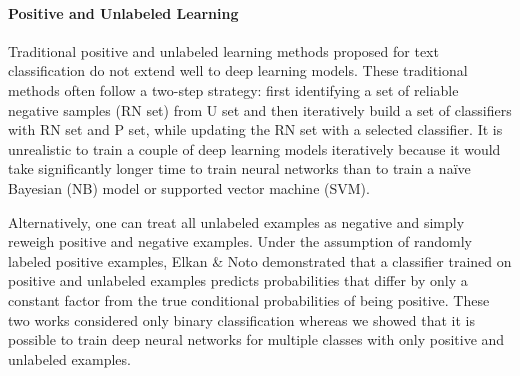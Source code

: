 


\paragraph{Positive and Unlabeled Learning}

Traditional positive and unlabeled learning methods proposed for text classification\cite{liu2003building} do not extend well to deep learning models.
These traditional methods often follow a two-step strategy: first identifying a set of reliable negative samples (RN set) from U set and then iteratively build a set of classifiers with RN set and P set, while updating the RN set with a selected classifier.
It is unrealistic to train a couple of deep learning models iteratively because it would take significantly longer time to train neural networks than to train a na\"ive Bayesian (NB) model or supported vector machine (SVM).

Alternatively, one can treat all unlabeled examples as negative and simply reweigh positive and negative examples\cite{lee2003learning}.
Under the assumption of randomly labeled positive examples, Elkan \& Noto\cite{elkan2008learning} demonstrated that a classifier trained on positive and unlabeled examples predicts probabilities that differ by only a constant factor from the true conditional probabilities of being positive.
These two works considered only binary classification whereas we showed that it is possible to train deep neural networks for multiple classes with only positive and unlabeled examples.

